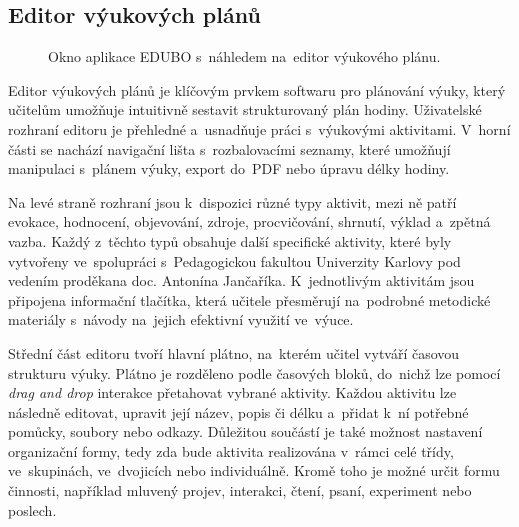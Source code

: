 \documentclass[male,czech,api_bc]{kitheses}
\begin{document}
\subsection{Editor výukových plánů}

\begin{figure}[H]
	\centering
	\caption{Okno aplikace EDUBO s~náhledem na~editor výukového plánu.}
	\label{fig:edubo-1}
\end{figure}

Editor výukových plánů je klíčovým prvkem softwaru pro plánování výuky, který učitelům umožňuje intuitivně sestavit strukturovaný plán hodiny. Uživatelské rozhraní editoru je přehledné a~usnadňuje práci s~výukovými aktivitami. V~horní části se nachází navigační lišta s~rozbalovacími seznamy, které umožňují manipulaci s~plánem výuky, export do~PDF nebo úpravu délky hodiny.

Na levé straně rozhraní jsou k~dispozici různé typy aktivit, mezi ně patří evokace, hodnocení, objevování, zdroje, procvičování, shrnutí, výklad a~zpětná vazba. Každý z~těchto typů obsahuje další specifické aktivity, které byly vytvořeny ve~spolupráci s~Pedagogickou fakultou Univerzity Karlovy pod vedením proděkana doc. Antonína Jančaříka. K~jednotlivým aktivitám jsou připojena informační tlačítka, která učitele přesměrují na~podrobné metodické materiály s~návody na~jejich efektivní využití ve~výuce.

Střední část editoru tvoří hlavní plátno, na~kterém učitel vytváří časovou strukturu výuky. Plátno je rozděleno podle časových bloků, do~nichž lze pomocí \textit{drag and drop} interakce přetahovat vybrané aktivity. Každou aktivitu lze následně editovat, upravit její název, popis či délku a~přidat k~ní potřebné pomůcky, soubory nebo odkazy. Důležitou součástí je také možnost nastavení organizační formy, tedy zda bude aktivita realizována v~rámci celé třídy, ve~skupinách, ve~dvojicích nebo individuálně. Kromě toho je možné určit formu činnosti, například mluvený projev, interakci, čtení, psaní, experiment nebo poslech.
\end{document}

